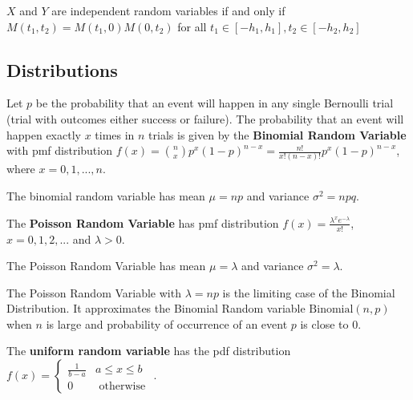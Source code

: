 \begin{thm}
    $X$ and $Y$ are independent random variables if and only if $M(t_1, t_2) = M(t_1, 0) M(0, t_2)$ for all $t_1 \in [-h_1, h_1], t_2 \in [-h_2, h_2]$
\end{thm}


\hhrule
\subsection*{Distributions}

\begin{defn}
    Let $p$ be the probability that an event will happen in any single Bernoulli trial (trial with outcomes either success or failure). The probability that an event will happen exactly $x$ times in $n$ trials is given by the \textbf{Binomial Random Variable} with pmf distribution $f(x) = {n \choose x} p^x (1-p)^{n-x} = \displaystyle \frac{n!}{x! (n-x)!} p^x (1-p)^{n-x}$, where $x = 0, 1, ... , n$.
\end{defn}

\begin{prop}
The binomial random variable has mean $\mu = np$ and variance $\sigma^2 = npq$.
\end{prop}

\begin{defn}
    The \textbf{Poisson Random Variable} has pmf distribution $f(x) = \displaystyle \frac{\lambda^x e^{-\lambda}}{x!}$, $x = 0, 1, 2, ...$ and $\lambda > 0$.
\end{defn}

\begin{prop}
The Poisson Random Variable has mean $\mu = \lambda$ and variance $\sigma^2 = \lambda$.
\end{prop}
\begin{prop}
    The Poisson Random Variable with $\lambda = np$ is the limiting case of the Binomial Distribution. It approximates the Binomial Random variable $\text{Binomial}(n,p)$ when $n$ is large and probability of occurrence of an event $p$ is close to $0$.
\end{prop}

\begin{defn}    
    The \textbf{uniform random variable} has the pdf distribution $f(x) = \begin{cases} \frac{1}{b-a} & a \leq x \leq b \\ 0 & \text { otherwise }\end{cases}$.
\end{defn}

